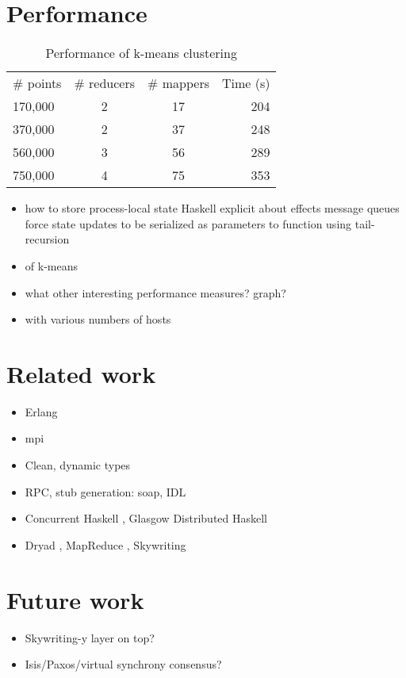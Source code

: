 \documentclass[preprint]{sigplanconf}
\begin{document}
\section{Performance}
\begin{center}
\begin{table}[h]
 \caption{Performance of k-means clustering}
\begin{tabular}{l c c|r}
\hline
  \# points & \# reducers & \# mappers & Time (s) \\
  170,000 & 2 & 17 & 204 \\
  370,000 & 2 & 37 & 248 \\
  560,000 & 3 & 56 & 289 \\
  750,000 & 4 & 75 & 353 \\
\hline
\end{tabular}
\end{table}
\end{center}
\begin{itemize}
\item how to store process-local state
Haskell explicit about effects
message queues force state updates to be serialized as parameters to function using tail-recursion 

\item of k-means
\item what other interesting performance measures? graph?
\item with various numbers of hosts
\end{itemize}

\section{Related work}
\begin{itemize}
\item Erlang 
\item mpi 
\item Clean, dynamic types
\item RPC, stub generation: soap, IDL
\item Concurrent Haskell \cite{Parallel2008}, Glasgow Distributed Haskell \cite{gdh2001}
\item Dryad \cite{Dryad2007}, MapReduce \cite{MapReduce2008}, Skywriting \cite{Murray2010}
\end{itemize}

\section{Future work}
\begin{itemize}
\item Skywriting-y layer on top?
\item Isis/Paxos/virtual synchrony consensus?
\end{itemize}
\end{document}
